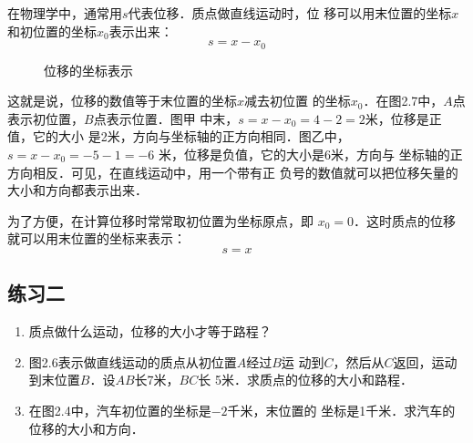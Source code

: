     在物理学中，通常用$s$代表位移．质点做直线运动时，位
移可以用末位置的坐标$x$和初位置的坐标$x_0$表示出来：
\[s=x-x_0\]
\begin{figure}[htp]
    \centering
    \caption{位移的坐标表示}
    \end{figure}

这就是说，位移的数值等于末位置的坐标$x$减去初位置
的坐标$x_0$．在图2.7中，$A$点表示初位置，$B$点表示位置．图甲
中末，$s=x-x_0=4-2=2$米，位移是正值，它的大小
是2米，方向与坐标轴的正方向相同．图乙中，$s=x-x_0=-5-1=-6$
米，位移是负值，它的大小是6米，方向与
坐标轴的正方向相反．可见，在直线运动中，用一个带有正
负号的数值就可以把位移矢量的大小和方向都表示出来．

    为了方便，在计算位移时常常取初位置为坐标原点，即
$x_0=0$．这时质点的位移就可以用末位置的坐标来表示：
\[s=x\]

\subsection*{练习二}
\begin{enumerate}
  \item   质点做什么运动，位移的大小才等于路程？
  \item  图2.6表示做直线运动的质点从初位置$A$经过$B$运
  动到$C$，然后从$C$返回，运动到末位置$B$．设$AB$长7米，$BC$长
  5米．求质点的位移的大小和路程．
  \item 在图2.4中，汽车初位置的坐标是$-2$千米，末位置的
  坐标是1千米．求汽车的位移的大小和方向．
  
\end{enumerate}


